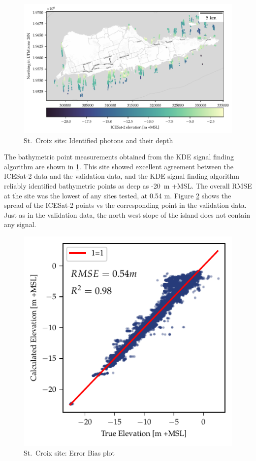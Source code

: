\begin{figure}[!ht]
    \centering
    \includegraphics{figures/stcroix_photon_map.pdf}
    \caption{St.~Croix site: Identified photons and their depth}
    \label{fig:st-croix-photons}
\end{figure}

The bathymetric point measurements obtained from the KDE signal finding algorithm are shown in \ref{fig:st-croix-photons}. This site showed excellent agreement between the ICESat-2 data and the validation data, and the KDE signal finding algorithm reliably identified bathymetric points as deep as -20~m +MSL. The overall RMSE at the site was the lowest of any sites tested, at 0.54 m. Figure \ref{fig:st-croix-bias-plot} shows the spread of the ICESat-2 points vs the corresponding point in the validation data. Just as in the validation data, the north west slope of the island does not contain any signal.

\begin{figure}[!ht]
    \centering
    \includegraphics{figures/stcroix_lidar_estimated_vs_truth.pdf}
    \caption{St.~Croix site: Error Bias plot}
    \label{fig:st-croix-bias-plot}
\end{figure}


